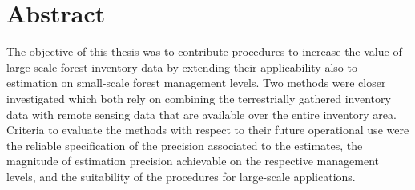 \chapter*{Abstract}
\label{chap:Abstract}

The objective of this thesis was to contribute procedures to increase the value of large-scale forest inventory data by extending their applicability also to estimation on small-scale forest management levels. Two methods were closer investigated which both rely on combining the terrestrially gathered inventory data with remote sensing data that are available over the entire inventory area. Criteria to evaluate the methods with respect to their future operational use were the reliable specification of the precision associated to the estimates, the magnitude of estimation precision achievable on the respective management levels, and the suitability of the procedures for large-scale applications.\par


